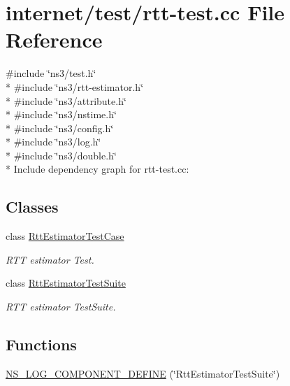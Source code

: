 \hypertarget{rtt-test_8cc}{}\section{internet/test/rtt-\/test.cc File Reference}
\label{rtt-test_8cc}
{\ttfamily \#include \char`\"{}ns3/test.\+h\char`\"{}}\\*
{\ttfamily \#include \char`\"{}ns3/rtt-\/estimator.\+h\char`\"{}}\\*
{\ttfamily \#include \char`\"{}ns3/attribute.\+h\char`\"{}}\\*
{\ttfamily \#include \char`\"{}ns3/nstime.\+h\char`\"{}}\\*
{\ttfamily \#include \char`\"{}ns3/config.\+h\char`\"{}}\\*
{\ttfamily \#include \char`\"{}ns3/log.\+h\char`\"{}}\\*
{\ttfamily \#include \char`\"{}ns3/double.\+h\char`\"{}}\\*
Include dependency graph for rtt-\/test.cc\+:
\subsection*{Classes}
\begin{DoxyCompactItemize}
\item 
class \hyperlink{classRttEstimatorTestCase}{Rtt\+Estimator\+Test\+Case}
\begin{DoxyCompactList}\small\item\em R\+TT estimator Test. \end{DoxyCompactList}\item 
class \hyperlink{classRttEstimatorTestSuite}{Rtt\+Estimator\+Test\+Suite}
\begin{DoxyCompactList}\small\item\em R\+TT estimator Test\+Suite. \end{DoxyCompactList}\end{DoxyCompactItemize}
\subsection*{Functions}
\begin{DoxyCompactItemize}
\item 
\hyperlink{rtt-test_8cc_ac6616a2cb19f048011e23ad37b96b540}{N\+S\+\_\+\+L\+O\+G\+\_\+\+C\+O\+M\+P\+O\+N\+E\+N\+T\+\_\+\+D\+E\+F\+I\+NE} (\char`\"{}Rtt\+Estimator\+Test\+Suite\char`\"{})
\end{DoxyCompactItemize}
